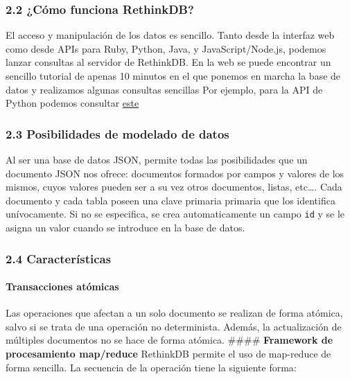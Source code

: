 \documentclass[11pt]{article}
\begin{document}
\hypertarget{cuxf3mo-funciona-rethinkdb}{%
\subsubsection{\texorpdfstring{2.2 \textbf{¿Cómo funciona
RethinkDB?}}{2.2 ¿Cómo funciona RethinkDB?}}\label{cuxf3mo-funciona-rethinkdb}}

El acceso y manipulación de los datos es sencillo. Tanto desde la
interfaz web como desde APIs para Ruby, Python, Java, y
JavaScript/Node.js, podemos lanzar consultas al servidor de RethinkDB.
En la web se puede encontrar un sencillo tutorial de apenas 10 minutos
en el que ponemos en marcha la base de datos y realizamos algunas
consultas sencillas Por ejemplo, para la API de Python podemos consultar
\href{https://rethinkdb.com/docs/guide/python/}{este}

\hypertarget{posibilidades-de-modelado-de-datos}{%
\subsubsection{\texorpdfstring{2.3 \textbf{Posibilidades de modelado de
datos}}{2.3 Posibilidades de modelado de datos}}\label{posibilidades-de-modelado-de-datos}}

Al ser una base de datos JSON, permite todas las posibilidades que un
documento JSON nos ofrece: documentos formados por campos y valores de
los mismos, cuyos valores pueden ser a su vez otros documentos, listas,
etc\ldots{}. Cada documento y cada tabla poseen una clave primaria
primaria que los identifica unívocamente. Si no se especifica, se crea
automaticamente un campo \texttt{id} y se le asigna un valor cuando se
introduce en la base de datos.

\hypertarget{caracteruxedsticas}{%
\subsubsection{\texorpdfstring{2.4
\textbf{Características}}{2.4 Características}}\label{caracteruxedsticas}}

\hypertarget{transacciones-atuxf3micas}{%
\paragraph{\texorpdfstring{\textbf{Transacciones
atómicas}}{Transacciones atómicas}}\label{transacciones-atuxf3micas}}

Las operaciones que afectan a un solo documento se realizan de forma
atómica, salvo si se trata de una operación no determinista. Además, la
actualización de múltiples documentos no se hace de forma atómica.
\#\#\#\# \textbf{Framework de procesamiento map/reduce} RethinkDB
permite el uso de map-reduce de forma sencilla. La secuencia de la
operación tiene la siguiente forma:
\end{document}
